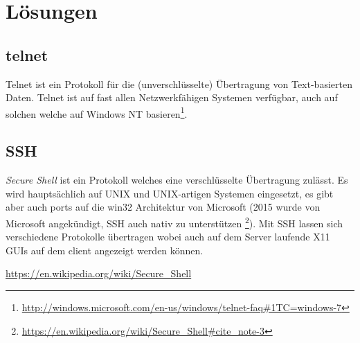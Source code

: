 \documentclass[11pt,twoside,a4paper]{article}
\begin{document}
	\section{Lösungen}
	\begin{multicols}{2}
          \subsection{telnet}
          Telnet ist ein Protokoll für die (unverschlüsselte) Übertragung von Text-basierten Daten. Telnet ist auf fast allen Netzwerkfähigen Systemen verfügbar, auch auf solchen welche auf Windows NT basieren\footnote{\url{http://windows.microsoft.com/en-us/windows/telnet-faq\#1TC=windows-7}}.
          \subsection{SSH}
          \textit{Secure Shell} ist ein Protokoll welches eine verschlüsselte Übertragung zulässt. Es wird hauptsächlich auf UNIX und UNIX-artigen Systemen eingesetzt, es gibt aber auch ports auf die win32 Architektur von Microsoft (2015 wurde von Microsoft angekündigt, SSH auch nativ zu unterstützen \footnote{\url{https://en.wikipedia.org/wiki/Secure_Shell\#cite_note-3}}). Mit SSH lassen sich verschiedene Protokolle übertragen wobei auch auf dem Server laufende X11 GUIs auf dem client angezeigt werden können.
          
	\end{multicols}

	\begin{thebibliography}{9}
        \url{https://en.wikipedia.org/wiki/Secure_Shell}
        \end{thebibliography}

	
\end{document}
